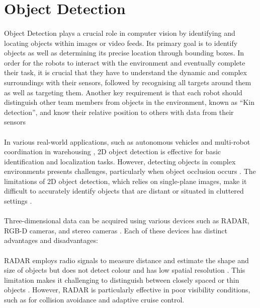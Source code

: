 \section{Object Detection}

\paragraph*{}
Object Detection plays a crucial role in computer vision by identifying and locating objects within images or video feeds. Its primary goal is to identify objects as well as determining its precise location through bounding boxes. In order for the robots to interact with the environment and eventually complete their task, it is crucial that they have to understand the dynamic and complex surroundings with their sensors, followed by recognising all targets around them as well as targeting them. Another key requirement is that each robot should distinguish other team members from objects in the environment, known as “Kin detection”, and know their relative position to others with data from their sensors

\paragraph*{}
In various real-world applications, such as autonomous vehicles \cite{redmon2016yolo} and multi-robot coordination in warehousing \cite{kumar2018multi}, 2D object detection is effective for basic identification and localization tasks. However, detecting objects in complex environments presents challenges, particularly when object occlusion occurs \cite{girshick2014rich}. The limitations of 2D object detection, which relies on single-plane images, make it difficult to accurately identify objects that are distant or situated in cluttered settings \cite{chen2023object}.

\paragraph*{}
Three-dimensional data can be acquired using various devices such as RADAR, RGB-D cameras, and stereo cameras \cite{karin2023comparative}. Each of these devices has distinct advantages and disadvantages:

\paragraph*{}
RADAR employs radio signals to measure distance and estimate the shape and size of objects but does not detect colour and has low spatial resolution \cite{karin2023comparative}. This limitation makes it challenging to distinguish between closely spaced or thin objects \cite{wang2020radar}. However, RADAR is particularly effective in poor visibility conditions, such as for collision avoidance and adaptive cruise control.


